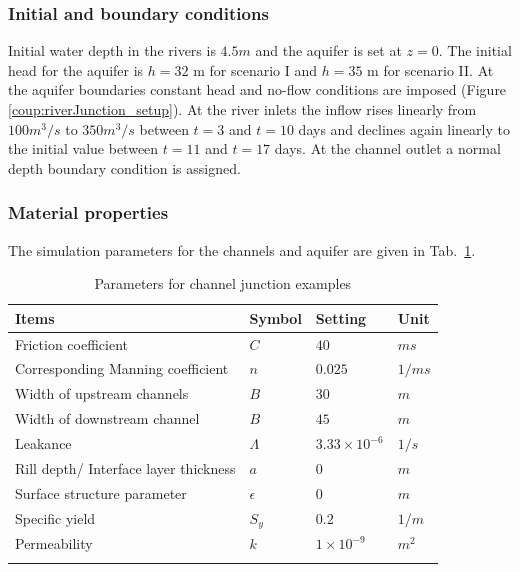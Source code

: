 \subsubsection*{Initial and boundary conditions}
%
Initial water depth in the rivers is $4.5m$ and the aquifer is set at $z = 0$.  The initial head for the aquifer is $h =32$ m for scenario I and $h=35$ m for scenario II.
At the  aquifer boundaries constant head and no-flow conditions are imposed (Figure \ref{coup:riverJunction_setup}). At the river inlets the inflow rises linearly from $100 m^3/s$ to $350 m^3/s$
between $t= 3$ and $t=10$ days and declines again linearly to the initial value between $t=11$ and $t= 17$ days. At the channel outlet a normal depth boundary condition is assigned.
%
\subsubsection*{Material properties}
The simulation parameters for the channels and aquifer are given in Tab.~\ref{Coup_ChannelPercolation}.
%
\begin{table}[H]
 \centering
 \caption{Parameters for channel junction examples}
 \centering \label{Coup_ChannelPercolation}
 \begin{tabular}{llll}
 \hline\hline\noalign{\smallskip}
 {\bf Items} & {\bf Symbol} & {\bf Setting} & {\bf Unit} \\ \hline
 Friction coefficient & $C$ & $40$ & $ms$ \\
 Corresponding Manning coefficient & $n$ & $0.025$ & $1/ms$ \\
 Width of upstream channels & $B$ & $30$ & $m$ \\
 Width of downstream channel & $B$ & $45$ & $m$ \\
 Leakance & $\Lambda $& $3.33\times 10^{-6}$ & $1/s$  \\
 Rill depth/ Interface layer thickness & $a$ & $0$ & $m$ \\
 Surface structure parameter & $\epsilon$ & $0$ & $m$  \\
 Specific yield & $S_y$ & $0.2$ & $1/m$ \\
 Permeability  & $k$ & $1\times 10^{-9}$ & $m^2$\\
\noalign{\smallskip}\hline\hline
 \end{tabular}
\end{table}
%
